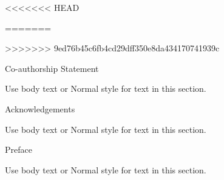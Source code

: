 

\setcounter{page}{2}

\clearpage
<<<<<<< HEAD
=======
>>>>>>> 9ed76b45c6fb4cd29dff350e8da434170741939c


\doublespacing

\clearpage


\clearpage
\begin{center} \Large Co-authorship Statement \end{center}

Use body text or Normal style for text in this section.

\clearpage
\begin{center} \Large Acknowledgements \end{center}

Use body text or Normal style for text in this section.

\clearpage
\singlespacing
{}
\tableofcontents

\clearpage
{}
\listoftables

\clearpage
{}
\listoffigures

\clearpage
{}
\listofplates

\clearpage
{}
\listofappendices

\printnomenclature

\clearpage
\doublespaceing
\begin{center} \Large Preface \end{center}

Use body text or Normal style for text in this section.

\clearpage

